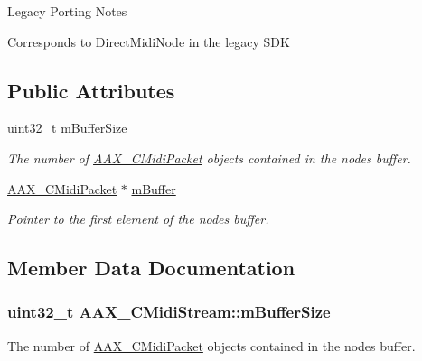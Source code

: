 \begin{DoxyRefDesc}{Legacy Porting Notes}
\item[\hyperlink{a00384__porting_notes000004}{Legacy Porting Notes}]Corresponds to Direct\+Midi\+Node in the legacy S\+D\+K \end{DoxyRefDesc}
\subsection*{Public Attributes}
\begin{DoxyCompactItemize}
\item 
uint32\+\_\+t \hyperlink{a00025_ad93c962a8278977f2a4f07b1e7490a90}{m\+Buffer\+Size}
\begin{DoxyCompactList}\small\item\em The number of \hyperlink{a00024}{A\+A\+X\+\_\+\+C\+Midi\+Packet} objects contained in the node\textquotesingle{}s buffer. \end{DoxyCompactList}\item 
\hyperlink{a00024}{A\+A\+X\+\_\+\+C\+Midi\+Packet} $\ast$ \hyperlink{a00025_a5011ea886dce57b382c23b82e56d3000}{m\+Buffer}
\begin{DoxyCompactList}\small\item\em Pointer to the first element of the node\textquotesingle{}s buffer. \end{DoxyCompactList}\end{DoxyCompactItemize}


\subsection{Member Data Documentation}
\hypertarget{a00025_ad93c962a8278977f2a4f07b1e7490a90}{}
\subsubsection[{m\+Buffer\+Size}]{\setlength{\rightskip}{0pt plus 5cm}uint32\+\_\+t A\+A\+X\+\_\+\+C\+Midi\+Stream\+::m\+Buffer\+Size}\label{a00025_ad93c962a8278977f2a4f07b1e7490a90}


The number of \hyperlink{a00024}{A\+A\+X\+\_\+\+C\+Midi\+Packet} objects contained in the node\textquotesingle{}s buffer. 

\hypertarget{a00025_a5011ea886dce57b382c23b82e56d3000}{}
